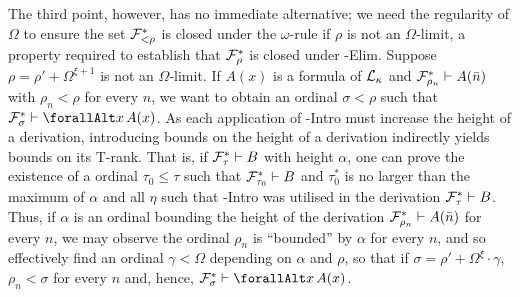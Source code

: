 \documentclass[UKenglish,cleveref,DIV=12]{scrartcl}
\let\forall\forallAlt
\theoremstyle{definition}
\theoremstyle{definition}
\begin{document}
The third point, however, has no immediate alternative; we need the regularity
of $\Omega$ to ensure the set $\mathcal{F}^*_{<\rho}$ is closed under the $\omega$-rule
if $\rho$ is not an $\Omega$-limit, a property required to establish that
$\mathcal{F}^*_\rho$ is closed under \textT\eta-Elim. Suppose
$\rho=\rho'+\Omega^{\xi+1}$ is not an $\Omega$-limit. If $A(x)$ is a formula of
$\mathcal{L}_\kappa$ and $\mathcal{F}^*_{\rho_n}\vdash A(\bar n)$ with $\rho_n<\rho$ for every
$n$, we want to obtain an ordinal $\sigma<\rho$ such that
$\FF^*_\sigma\proves\forall x\, A(x)$.
%
As each application of \textT\eta-Intro must increase the height of a
derivation, introducing bounds on the height of a derivation indirectly yields
bounds on its T-rank. That is, if $\mathcal{F}^*_\tau\vdash B$ with height
$\alpha$, one can prove the existence of a ordinal $\tau_0\le\tau$ such that
$\mathcal{F}^*_{\tau_0}\vdash B$ and $\tau_0^*$ is no larger than the maximum of
$\alpha$ and all $\eta$ such that \textT\eta-Intro was utilised in the
derivation $\mathcal{F}^*_{\tau}\vdash B$. Thus, if $\alpha$ is an ordinal bounding
the height of the derivation $\mathcal{F}^*_{\rho_n}\vdash A(\bar n)$ for every
$n$,
we may observe the ordinal $\rho_n$
is ``bounded'' by $\alpha$ for every $n$, and so effectively find an ordinal $\gamma<\Omega$
depending on $\alpha$ and $\rho$, so that if
$\sigma=\rho'+\Omega^\xi\cdot\gamma$, $\rho_n<\sigma$ for every $n$ and, hence,
$\FF^*_\sigma\proves \forall x\,A(x)$.
\end{document}
